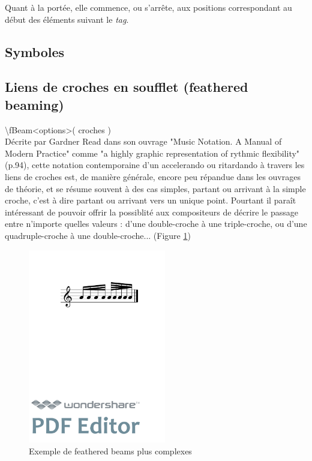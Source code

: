 \documentclass{article}
\newenvironment{code}
  {\fontfamily{pnc}\selectfont}{}
\begin{document}
Quant à la portée, elle commence, ou s'arrête, aux positions correspondant au début des éléments suivant le \emph{tag}.


\subsection{Symboles}\label{subsec:symboles}



\subsection{Liens de croches en soufflet (feathered beaming)}

\begin{code}
\textbackslash{}fBeam\textless{}options\textgreater{}( croches )
\end{code}
\\

Décrite par Gardner Read dans son ouvrage "Music Notation. A Manual of Modern Practice" \cite{ref8} comme "a highly graphic representation of rythmic flexibility"(p.94), cette notation contemporaine d'un accelerando ou ritardando à travers les liens de croches est, de manière générale, encore peu répandue dans les ouvrages de théorie, et se résume souvent à des cas simples, partant ou arrivant à la simple croche, c'est à dire partant ou arrivant vers un unique point. Pourtant il paraît intéressant de pouvoir offrir la possiblité aux compositeurs de décrire le passage entre n'importe quelles valeurs : d'une double-croche à une triple-croche, ou d'une quadruple-croche à une double-croche... (Figure \ref{fig:fbeamcomplex})

\begin{figure}[h]
\centering
\includegraphics[width=6cm]{img/fbeamcomplex.pdf}
\caption{Exemple de feathered beams plus complexes}
\label{fig:fbeamcomplex}
\end{figure}
\end{document}
